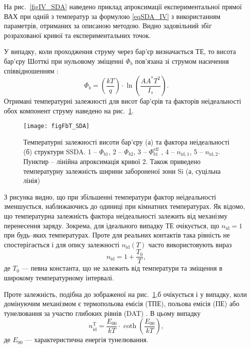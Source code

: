 На рис.~\ref{figIV_SDA} наведено приклад апроксимації експериментальної прямої ВАХ при одній з температур за формулою \eqref{eqSDA_IV} з використанням параметрів,
отриманих за описаною методою.
Видно задовільний збіг розрахованої кривої та експериментальних точок.

У випадку, коли проходження струму через бар'єр визначається ТЕ, то висота бар'єру Шотткі при
нульовому зміщенні $\Phi_b$ пов'язана зі струмом насичення співвідношенням \cite{Rhoderick1988}:
\begin{equation}
\label{eqFb:TE}
\Phi_b=\left(\frac{kT}{q}\right)\cdot\ln\left(\frac{AA^*T^2}{I_s}\right).
\end{equation}
Отримані температурні залежності для висот бар'єрів та факторів неідеальності обох компонент струму наведено на рис.~\ref{figFbT_SDA}.



\begin{figure}
\center
\texttt{[image: figFbT\_SDA]}
\caption{\label{figFbT_SDA}
Температурні залежності висоти бар'єру (а) та фактора неідеальності (б) структури SSDA.
1 -- $\Phi_{b1}$,
2 -- $\Phi_{b2}$,
3 -- $\Phi_{b1}^\mathrm{eff}$ ,
4 -- $n_{\mathrm{id},1}$, 5 -- $n_{\mathrm{id},2}$.
Пунктир -- лінійна апроксимація кривої 2.
Також приведено температурну залежність ширини забороненої зони Si (а, суцільна лінія)
}%
\end{figure}

З рисунка видно, що при збільшенні температури фактор неідеальності зменшується, наближаючись
до одиниці при кімнатних температурах.
Як відомо, що температурна залежність фактора неідеальності залежить від механізму перенесення заряду.
Зокрема, для ідеального випадку ТЕ очікується, що $n_{\mathrm{id}}=1$ при будь--яких температурах.
Проте для реальних контактів така рівність не спостерігається і для опису залежності $n_{\mathrm{id}}(T)$
часто використовують вираз \cite{Rhoderick1988, Sze2012}
\begin{equation}\label{eqN_T:TE}
n_{\mathrm{id}}=1+\frac{T_0}{T},
\end{equation}
де $T_0$ --- певна константа, що не залежить від температури та зміщення в широкому температурному інтервалі.

Проте залежність, подібна до зображеної на рис.~\ref{figFbT_SDA},б очікується
і у випадку, коли домінуючим механізмом є термопольова  емісія (ТПЕ), польова емісія (ПЕ) або тунелювання за участю глибоких рівнів (DAT)
\cite{Rhoderick1988,Evstropov,Soylu,JYOTHI2015,OZAVCI2013,Abhishek}.
В цьому випадку
\begin{equation}\label{eqN_T:TFE}
n_{\mathrm{id}}^\mathrm{T}=\frac{E_{00}}{kT}\cdot\coth\left(\frac{E_{00}}{kT}\right),
\end{equation}
де $E_{00}$ --- характеристична енергія тунелювання.


